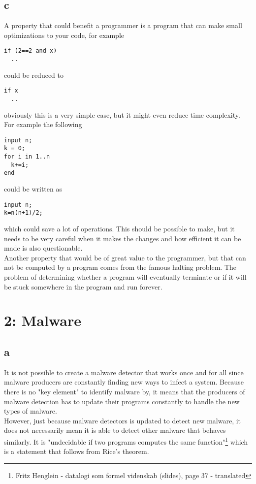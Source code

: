 \documentclass[12pt]{article}
\begin{document}
\subsection*{c}
A property that could benefit a programmer is a program that can make small optimizations to your code, for example
\begin{verbatim}
if (2==2 and x)
  ..
\end{verbatim}
could be reduced to
\begin{verbatim}
if x
  ..
\end{verbatim}
obviously this is a very simple case, but it might even reduce time complexity. For example the following
\begin{verbatim}
input n;
k = 0;
for i in 1..n
  k+=i;
end
\end{verbatim}
could be written as
\begin{verbatim}
input n;
k=n(n+1)/2;
\end{verbatim}
which could save a lot of operations. This should be possible to make, but it needs to be very careful when it makes the changes and how efficient it can be made is also questionable.\\
Another property that would be of great value to the programmer, but that can not be computed by a program comes from the famous halting problem. The problem of determining whether a program will eventually terminate or if it will be stuck somewhere in the program and run forever.


\section*{2: Malware}
\subsection*{a}
It is not possible to create a malware detector that works once and for all since malware producers are constantly finding new ways to infect a system. Because there is no "key element" to identify malware by, it means that the producers of malware detection has to update their programs constantly  to handle the new types of malware.\\
However, just because malware detectors is updated to detect new malware, it does not necessarily mean it is able to detect other malware that behaves similarly. It is "undecidable if two programs computes the same function"\footnote{Fritz Henglein - datalogi som formel videnskab (slides), page 37 - translated} which is a statement that follows from Rice's theorem. 
\end{document}
